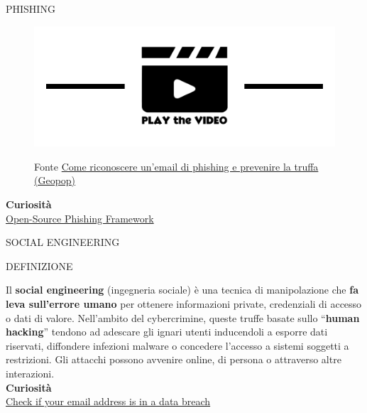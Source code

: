 \documentclass[aspectratio=1610]{beamer}
\begin{document}
\begin{frame}{PHISHING}
    \begin{figure}
        \href{https://www.geopop.it/la-truffa-delle-email-cose-il-phishing-e-come-evitarlo/}{\includegraphics[width=\linewidth]{img/play.png}}
        \caption{{Fonte \href{https://www.geopop.it/la-truffa-delle-email-cose-il-phishing-e-come-evitarlo/}{Come riconoscere un’email di phishing e prevenire la truffa (Geopop)}}}
    \end{figure}   
    \bigskip
    \tiny{\textbf{Curiosità}}\\
    \tiny{\href{https://getgophish.com/}{Open-Source Phishing Framework}}      
\end{frame}

\begin{frame}{SOCIAL ENGINEERING}
    \begin{alertblock}{DEFINIZIONE}
        \begin{minipage}{0.98\linewidth}
            \justifying
            Il \textbf{social engineering} (ingegneria sociale) è una tecnica di manipolazione che \textbf{fa leva sull'errore umano} 
            per ottenere informazioni private, credenziali di accesso o dati di valore. Nell'ambito del 
            cybercrimine, queste truffe basate sullo ``\textbf{human hacking}'' tendono ad adescare gli ignari 
            utenti inducendoli a esporre dati riservati, diffondere infezioni malware o concedere l'accesso 
            a sistemi soggetti a restrizioni. Gli attacchi possono avvenire online, di persona o attraverso 
            altre interazioni.\\
            \bigskip
            \tiny{\textbf{Curiosità}}\\
            \tiny{\href{https://haveibeenpwned.com/}{Check if your email address is in a data breach}}
        \end{minipage}
    \end{alertblock}
\end{frame}
\end{document}
